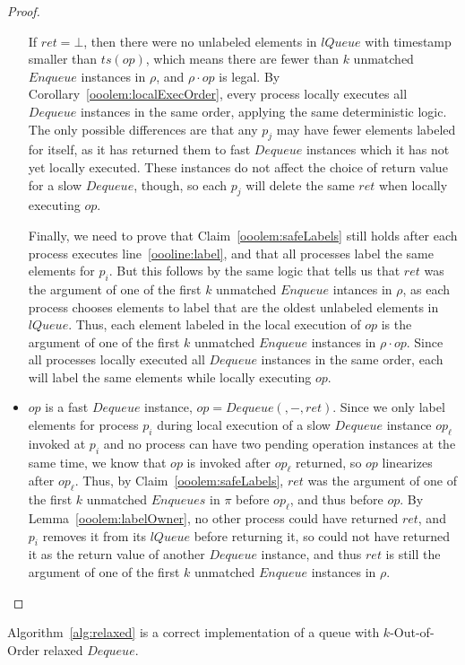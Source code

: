\documentclass[a4paper,anonymous,USenglish]{lipics-v2021}
\theoremstyle{definition}
\begin{document}
\begin{proof}
\begin{itemize}
    If $ret = \bot$, then there were no unlabeled elements in $lQueue$ with timestamp smaller than $ts(op)$, which means there are fewer than $k$ unmatched $Enqueue$ instances in $\rho$, and $\rho \cdot op$ is legal.  By Corollary~\ref{ooolem:localExecOrder}, every process locally executes all $Dequeue$ instances in the same order, applying the same deterministic logic.  The only possible differences are that any $p_j$ may have fewer elements labeled for itself, as it has returned them to fast $Dequeue$ instances which it has not yet locally executed.  These instances do not affect the choice of return value for a slow $Dequeue$, though, so each $p_j$ will delete the same $ret$ when locally executing $op$.  

    Finally, we need to prove that Claim~\ref{ooolem:safeLabels} still holds after each process executes line~\ref{oooline:label}, and that all processes label the same elements for $p_i$.  But this follows by the same logic that tells us that $ret$ was the argument of one of the first $k$ unmatched $Enqueue$ intances in $\rho$, as each process chooses elements to label that are the oldest unlabeled elements in $lQueue$.  Thus, each element labeled in the local execution of $op$ is the argument of one of the first $k$ unmatched $Enqueue$ instances in $\rho \cdot op$.  Since all processes locally executed all $Dequeue$ instances in the same order, each will label the same elements while locally executing $op$.
%
  \item $op$ is a fast $Dequeue$ instance, $op = Dequeue(,-,ret)$.  Since we only label elements for process $p_i$ during local execution of a slow $Dequeue$ instance $op_\ell$ invoked at $p_i$ and no process can have two pending operation instances at the same time, we know that $op$ is invoked after $op_\ell$ returned, so $op$ linearizes after $op_\ell$.  Thus, by Claim~\ref{ooolem:safeLabels}, $ret$ was the argument of one of the first $k$ unmatched $Enqueues$ in $\pi$ before $op_\ell$, and thus before $op$.  By Lemma~\ref{ooolem:labelOwner}, no other process could have returned $ret$, and $p_i$ removes it from its $lQueue$ before returning it, so could not have returned it as the return value of another $Dequeue$ instance, and thus $ret$ is still the argument of one of the first $k$ unmatched $Enqueue$ instances in $\rho$.
  \end{itemize}
\end{proof}

\begin{theorem}
  Algorithm~\ref{alg:relaxed} is a correct implementation of a queue with $k$-Out-of-Order relaxed $Dequeue$.
\end{theorem}
\end{document}

